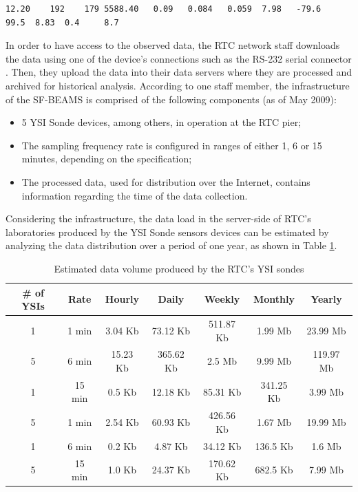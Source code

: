 \lstset{label=data:ysi-stream,caption=The Collected Data Stream from the
YSI Sonde 6600ESDV2}
\begin{lstlisting}
12.20    192    179 5588.40   0.09   0.084   0.059  7.98   -79.6   99.5  8.83  0.4     8.7
\end{lstlisting}

In order to have access to the observed data, the RTC network staff downloads
the data using one of the device's connections such as the RS-232 serial connector
\cite{rs232}. Then, they upload the data into their data servers where they are
processed and archived for historical analysis. According to one
staff member, the infrastructure of the SF-BEAMS is comprised of the 
following components (as of May 2009):

\begin{itemize}
  \item 5 YSI Sonde devices, among others, in operation at the RTC pier;
  \item The sampling frequency rate is configured in ranges of either 1, 6 or
  15 minutes, depending on the specification;
  \item The processed data, used for distribution over the Internet,
   contains information regarding the time of the data collection.
\end{itemize}

Considering the infrastructure, the data load in the server-side
of RTC's laboratories produced by the YSI Sonde sensors devices can be
estimated by analyzing the data distribution over a period of one year, as
shown in Table \ref{tab:year-data-distribution}.

\begin{table}[!b]
    \label{tab:year-data-distribution}
     \begin{center}
      \begin{tabular}{|c|c|c|c|c|c|c|}\hline 
        \textbf{\# of YSIs} & \textbf{Rate} & \textbf{Hourly} &
        \textbf{Daily} & \textbf{Weekly} & \textbf{Monthly} & \textbf{Yearly}\\\hline 
        1 & 1 min & 3.04 Kb & 73.12 Kb & 511.87 Kb & 1.99 Mb & 23.99 Mb\\\hline 
        5 & 6 min & 15.23 Kb & 365.62 Kb & 2.5 Mb & 9.99 Mb & 119.97 Mb\\\hline 
        1 & 15 min & 0.5 Kb & 12.18 Kb & 85.31 Kb & 341.25 Kb & 3.99 Mb\\\hline 
        5 & 1 min & 2.54 Kb & 60.93 Kb & 426.56 Kb & 1.67 Mb & 19.99 Mb\\\hline
        1 & 6 min & 0.2 Kb & 4.87 Kb & 34.12 Kb & 136.5 Kb & 1.6 Mb\\\hline 
        5 & 15 min & 1.0 Kb & 24.37 Kb & 170.62 Kb & 682.5 Kb & 7.99 Mb\\\hline
        \end{tabular}
        \caption{Estimated data volume produced by the RTC's YSI sondes}
      \end{center}
\end{table}

